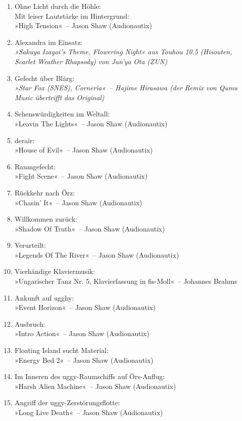 \begin{enumerate}
    \item Ohne Licht durch die Höhle:\\ Mit leiser Lautstärke im Hintergrund:\\ »High Tension«~– Jason Shaw (Audionautix)
    \item Alexandra im Einsatz:\\  \textit{»Sakuya Izayoi's Theme, Flowering Night« aus Touhou 10.5 (Hisouten, Scarlet Weather Rhapsody) von Jun'ya Ota (ZUN)}
    \item Gefecht über Blärg:\\ \textit{»Star Fox (SNES), Corneria«~– Hajime Hirasawa (der Remix von Qumu Music übertrifft das Original)}
    \item Sehenswürdigkeiten im Weltall:\\ »Leavin The Lights«~– Jason Shaw (Audionautix)
    \item derair:\\ »House of Evil«~– Jason Shaw (Audionautix)
    \item Raumgefecht:\\ »Fight Scene«~– Jason Shaw (Audionautix)
    \item Rückkehr nach Örz:\\ »Chasin’ It«~– Jason Shaw (Audionautix)
    \item Willkommen zurück:\\ »Shadow Of Truth«~– Jason Shaw (Audionautix)
    \item Verurteilt:\\ »Legends Of The River«~– Jason Shaw (Audionautix)
    \item Vierhändige Klaviermusik:\\ »Ungarischer Tanz Nr. 5, Klavierfassung in fis-Moll«~– Johannes Brahms
    \item Ankunft auf ugghy:\\ »Event Horizon«~– Jason Shaw (Audionautix)
    \item Ausbruch:\\ »Intro Action«~– Jason Shaw (Audionautix)
    \item Floating Island sucht Material:\\ »Energy Bed 2«~– Jason Shaw (Audionautix)
    \item Im Inneren des uggy-Raumschiffs auf Örs-Anflug:\\ »Harsh Alien Machine«~– Jason Shaw (Audionautix)
    \item Angriff der uggy-Zerstörungsflotte:\\ »Long Live Death«~– Jason Shaw (Audionautix)

\end{enumerate}
